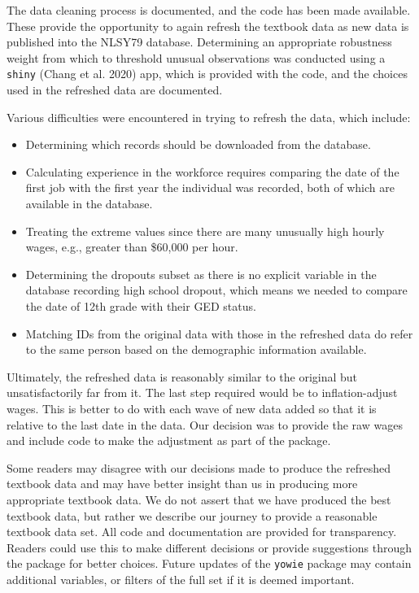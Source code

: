 \documentclass[12pt]{article}
\providecommand{\tightlist}{%
  \setlength{\itemsep}{0pt}\setlength{\parskip}{0pt}}
\begin{document}
The data cleaning process is documented, and the code has been made available. These provide the opportunity to again refresh the textbook data as new data is published into the NLSY79 database. Determining an appropriate robustness weight from which to threshold unusual observations was conducted using a \texttt{shiny} (Chang et al. 2020) app, which is provided with the code, and the choices used in the refreshed data are documented.

Various difficulties were encountered in trying to refresh the data, which include:

\begin{itemize}
\tightlist
\item
  Determining which records should be downloaded from the database.
\item
  Calculating experience in the workforce requires comparing the date of the first job with the first year the individual was recorded, both of which are available in the database.
\item
  Treating the extreme values since there are many unusually high hourly wages, e.g., greater than \$60,000 per hour.
\item
  Determining the dropouts subset as there is no explicit variable in the database recording high school dropout, which means we needed to compare the date of 12th grade with their GED status.
\item
  Matching IDs from the original data with those in the refreshed data do refer to the same person based on the demographic information available.
\end{itemize}

Ultimately, the refreshed data is reasonably similar to the original but unsatisfactorily far from it. The last step required would be to inflation-adjust wages. This is better to do with each wave of new data added so that it is relative to the last date in the data. Our decision was to provide the raw wages and include code to make the adjustment as part of the package.

Some readers may disagree with our decisions made to produce the refreshed textbook data and may have better insight than us in producing more appropriate textbook data. We do not assert that we have produced the best textbook data, but rather we describe our journey to provide a reasonable textbook data set. All code and documentation are provided for transparency. Readers could use this to make different decisions or provide suggestions through the package for better choices. Future updates of the \texttt{yowie} package may contain additional variables, or filters of the full set if it is deemed important.
\end{document}
